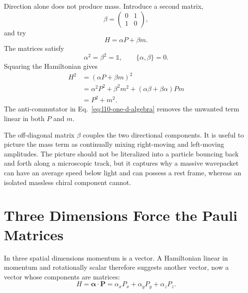 Direction alone does not produce mass. Introduce a second matrix,
\begin{equation}
\beta=
\begin{pmatrix}
0&1\\
1&0
\end{pmatrix},
\end{equation}
and try
\begin{equation}
H=\alpha P+\beta m.
\label{eq:l10-massive-one-d}
\end{equation}
The matrices satisfy
\begin{equation}
\alpha^2=\beta^2=\mathbb{1},
\qquad
\{\alpha,\beta\}=0.
\label{eq:l10-one-d-algebra}
\end{equation}
Squaring the Hamiltonian gives
\begin{align}
H^2
&=(\alpha P+\beta m)^2\\
&=\alpha^2P^2+\beta^2m^2
  +(\alpha\beta+\beta\alpha)Pm\\
&=P^2+m^2.
\label{eq:l10-one-d-dispersion}
\end{align}
The anti-commutator in Eq.~\eqref{eq:l10-one-d-algebra} removes the unwanted term linear in both \(P\) and \(m\).

The off-diagonal matrix \(\beta\) couples the two directional components. It is useful to picture the mass term as continually mixing right-moving and left-moving amplitudes. The picture should not be literalized into a particle bouncing back and forth along a microscopic track, but it captures why a massive wavepacket can have an average speed below light and can possess a rest frame, whereas an isolated massless chiral component cannot.

\begin{classroomqa}
\end{classroomqa}

\section{Three Dimensions Force the Pauli Matrices}

In three spatial dimensions momentum is a vector. A Hamiltonian linear in momentum and rotationally scalar therefore suggests another vector, now a vector whose components are matrices:
\begin{equation}
H=\boldsymbol{\alpha}\cdot\mathbf P
=\alpha_xP_x+\alpha_yP_y+\alpha_zP_z.
\label{eq:l10-three-d-ansatz}
\end{equation}

